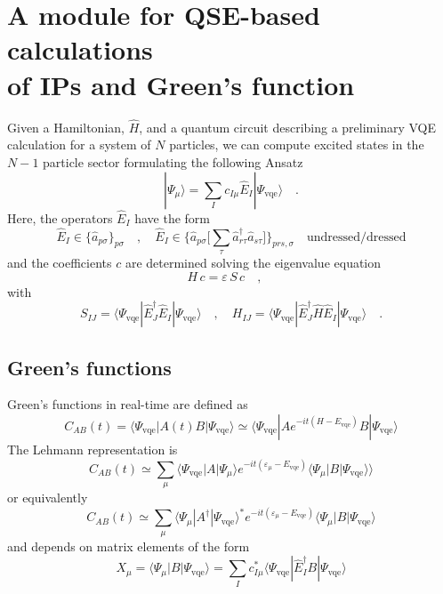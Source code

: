 \documentclass{report}
\begin{document}
\section{A module for QSE-based calculations \\
of IPs and Green's function}

Given a Hamiltonian,  $\hat{H}$, and a quantum circuit describing a preliminary VQE calculation
for a system of $N$ particles, we can compute excited states in the $N-1$ particle sector formulating the following Ansatz
\begin{equation}
| \Psi_\mu \rangle = \sum_I c_{I\mu} \hat{E}_I | \Psi_{\mathrm{vqe}} \rangle
\quad.
\end{equation}
Here, the operators $\hat{E}_I$ have the form
\begin{equation}
\hat{E}_I \in \{ \hat{a}_{p\sigma} \}_{p\sigma}
\quad,\quad
\hat{E}_I \in \{ \hat{a}_{p\sigma} \Big[ \sum_\tau \hat{a}^\dagger_{r\tau} \hat{a}_{s\tau} \Big] \}_{prs,\sigma}
\quad
\mbox{undressed/dressed}
\end{equation}
and the coefficients $c$ are determined solving the eigenvalue equation
\begin{equation}
H \, c = \varepsilon \, S \, c
\quad,\quad
\end{equation}
with
\begin{equation}
S_{IJ} = \langle \Psi_{\mathrm{vqe}} | \hat{E}^\dagger_J \hat{E}_I | \Psi_{\mathrm{vqe}} \rangle
\quad,\quad
H_{IJ} = \langle \Psi_{\mathrm{vqe}} | \hat{E}^\dagger_J  \hat{H} \hat{E}_I | \Psi_{\mathrm{vqe}} \rangle
\quad.
\end{equation}

\subsection{Green's functions}

Green's functions in real-time are defined as
\begin{equation}
C_{AB}(t) = \langle \Psi_{\mathrm{vqe}} | A(t) B | \Psi_{\mathrm{vqe}} \rangle \simeq  
\langle \Psi_{\mathrm{vqe}} | A e^{-i t(H-E_{\mathrm{vqe}})}  B | \Psi_{\mathrm{vqe}} \rangle 
\end{equation}
The Lehmann representation is 
\begin{equation}
C_{AB}(t) \simeq 
\sum_\mu \langle \Psi_{\mathrm{vqe}} | A | \Psi_\mu \rangle e^{-i t(\varepsilon_\mu-E_{\mathrm{vqe}})}  \langle \Psi_\mu | B | \Psi_{\mathrm{vqe}} \rangle 
\rangle 
\end{equation}
or equivalently
\begin{equation}
C_{AB}(t) \simeq 
\sum_\mu \langle \Psi_\mu | A^\dagger | \Psi_{\mathrm{vqe}} \rangle^* e^{-i t(\varepsilon_\mu-E_{\mathrm{vqe}})}  \langle \Psi_\mu | B | \Psi_{\mathrm{vqe}} \rangle 
\end{equation}
and depends on matrix elements of the form
\begin{equation}
X_\mu = \langle \Psi_\mu | B | \Psi_{\mathrm{vqe}} \rangle = \sum_I c_{I\mu}^* \langle \Psi_{\mathrm{vqe}} | \hat{E}_I^\dagger B | \Psi_{\mathrm{vqe}} \rangle
\end{equation}
 
\end{document}
